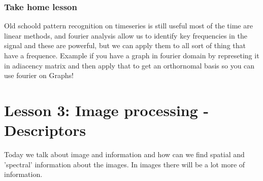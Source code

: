 \documentclass[12pt]{book}
\begin{document}
\subsection{Take home lesson}
Old schoold pattern recognition on timeseries is still useful most of the time are linear methods, and fourier analysis allow us to identify key frequencies in the signal and these are powerful, but we can apply them to all sort of thing that have a frequence.
Example if you have a graph in fourier domain by represeting it in adiacency matrix and then apply that to get an orthornomal basis so you can use fourier on Graphs!


\chapter{Lesson 3: Image processing - Descriptors}
Today we talk about image and information and how can we find spatial and 'spectral' information about the images. \newline
In images there will be a lot more of information.
\end{document}
